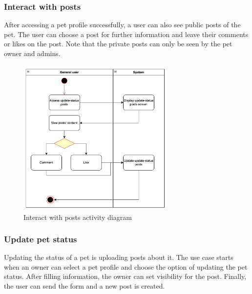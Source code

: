 \subsubsection{Interact with posts}

After accessing a pet profile successfully, a user can also see public posts of the pet. The user can choose a post for further information and leave their comments or likes on the post. Note that the private posts can only be seen by the pet owner and admins.

\begin{figure}[H]
  \centering
  \includegraphics[width=0.7\textwidth]{Figures/post_interact.png}
  \caption{Interact with posts activity diagram}
  \label{fig:interact-post}
\end{figure}


\subsubsection{Update pet status}

Updating the status of a pet is uploading posts about it. The use case starts when an owner can select a pet profile and choose the option of updating the pet status. After filling information, the owner can set visibility for the post. Finally, the user can send the form and a new post is created.

